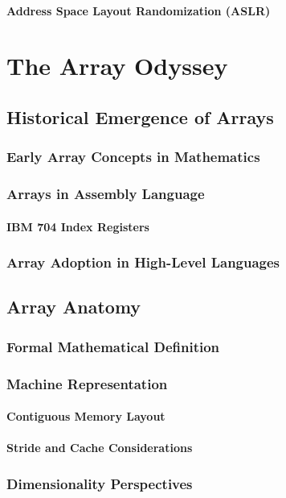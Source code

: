 \documentclass[12pt, oneside]{book}
\begin{document}
	\subsection{Address Space Layout Randomization (ASLR)}
		
	\part{The Array Odyssey}
	 \chapter{Historical Emergence of Arrays}
	 \section{Early Array Concepts in Mathematics}
	 \section{Arrays in Assembly Language}
	 \subsection{IBM 704 Index Registers}
	 \section{Array Adoption in High-Level Languages}
	 
	 \chapter{Array Anatomy}
	 \section{Formal Mathematical Definition}
	 \section{Machine Representation}
	 \subsection{Contiguous Memory Layout}
	 \subsection{Stride and Cache Considerations}
	 \section{Dimensionality Perspectives}
\end{document}
